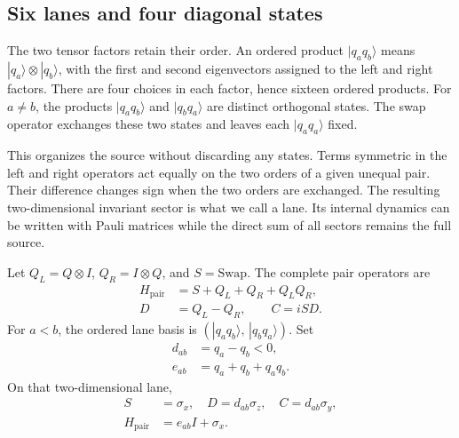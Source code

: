 \documentclass[10pt,twocolumn,letterpaper]{article}
\begin{document}
\subsection{Six lanes and four diagonal states}

The two tensor factors retain their order. An ordered product $|q_aq_b\rangle$ means $|q_a\rangle\otimes|q_b\rangle$, with the first and second eigenvectors assigned to the left and right factors. There are four choices in each factor, hence sixteen ordered products. For $a\ne b$, the products $|q_aq_b\rangle$ and $|q_bq_a\rangle$ are distinct orthogonal states. The swap operator exchanges these two states and leaves each $|q_aq_a\rangle$ fixed.

This organizes the source without discarding any states. Terms symmetric in the left and right operators act equally on the two orders of a given unequal pair. Their difference changes sign when the two orders are exchanged. The resulting two-dimensional invariant sector is what we call a lane. Its internal dynamics can be written with Pauli matrices while the direct sum of all sectors remains the full source.


Let $Q_L=Q\otimes I$, $Q_R=I\otimes Q$, and $S=\mathrm{Swap}$. The complete pair operators are
\begin{equation}
\begin{aligned}
H_{\mathrm{pair}}&=S+Q_L+Q_R+Q_LQ_R,\\
D&=Q_L-Q_R,\qquad C=iSD.
\end{aligned}
\tag{5}
\end{equation}
For $a<b$, the ordered lane basis is $(|q_aq_b\rangle,\,|q_bq_a\rangle)$. Set
\begin{equation}
\begin{aligned}
d_{ab}&=q_a-q_b<0,\\
e_{ab}&=q_a+q_b+q_aq_b.
\end{aligned}
\tag{6}
\end{equation}
On that two-dimensional lane,
\begin{equation}
\begin{aligned}
S&=\sigma_x,\quad D=d_{ab}\sigma_z,\quad C=d_{ab}\sigma_y,\\
H_{\mathrm{pair}}&=e_{ab}I+\sigma_x.
\end{aligned}
\tag{7}
\end{equation}
\end{document}
